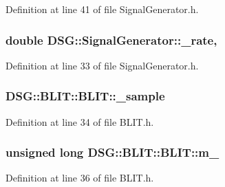 Definition at line 41 of file Signal\-Generator.\-h.

\hypertarget{classDSG_1_1SignalGenerator_aa10f6c85d9adee901139ea7fb346f39d}{
\subsubsection[{\-\_\-rate}]{\setlength{\rightskip}{0pt plus 5cm}double D\-S\-G\-::\-Signal\-Generator\-::\-\_\-rate\hspace{0.3cm}{\ttfamily [protected]}, {\ttfamily [inherited]}}}\label{classDSG_1_1SignalGenerator_aa10f6c85d9adee901139ea7fb346f39d}


Definition at line 33 of file Signal\-Generator.\-h.

\hypertarget{classDSG_1_1BLIT_1_1BLIT_ace572cf299ea45d5e6399d4a5a0dc31f}{
\subsubsection[{\-\_\-sample}]{ D\-S\-G\-::\-B\-L\-I\-T\-::\-B\-L\-I\-T\-::\-\_\-sample\hspace{0.3cm}{\ttfamily [protected]}}}\label{classDSG_1_1BLIT_1_1BLIT_ace572cf299ea45d5e6399d4a5a0dc31f}


Definition at line 34 of file B\-L\-I\-T.\-h.

\hypertarget{classDSG_1_1BLIT_1_1BLIT_ac21b921cd1a9b2ec1d091ae8ed0502a2}{
\subsubsection[{m\-\_\-}]{\setlength{\rightskip}{0pt plus 5cm}unsigned long D\-S\-G\-::\-B\-L\-I\-T\-::\-B\-L\-I\-T\-::m\-\_\-\hspace{0.3cm}{\ttfamily [protected]}}}\label{classDSG_1_1BLIT_1_1BLIT_ac21b921cd1a9b2ec1d091ae8ed0502a2}


Definition at line 36 of file B\-L\-I\-T.\-h.

